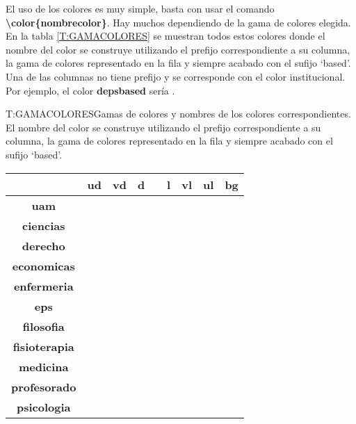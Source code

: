 \def\colbox#1#2{\fcolorbox{maincolor}{#1#2based}{\small\phantom{aaa}}}
\def\mytableline#1{\textbf{#1} & \colbox{ud}{#1} & \colbox{vd}{#1} & \colbox{d}{#1} & \colbox{}{#1} & \colbox{l}{#1} & \colbox{vl}{#1} & \colbox{ul}{#1} & \colbox{bg}{#1} \\}

 \def\colboxc#1#2#3{\fcolorbox{maincolor}{#1#2based#3}{\small\phantom{aaa}}}

 \def\mytablelineb#1#2{\textbf{#2} & \colboxc{#1}{#2}{one} & \colboxc{#1}{#2}{two} & \colboxc{#1}{#2}{three} & \colboxc{#1}{#2}{four} & \colboxc{#1}{#2}{five} & \colboxc{#1}{#2}{six} & \colboxc{#1}{#2}{seven} & \colboxc{#1}{#2}{eight}\\ }

\def\mytablelinec#1#2#3{\textbf{#2} & \colboxc{#1}{#3}{one} & \colboxc{#1}{#3}{two} & \colboxc{#1}{#3}{three} & \colboxc{#1}{#3}{four} & \colboxc{#1}{#3}{five} & \colboxc{#1}{#3}{six} & \colboxc{#1}{#3}{seven} & \colboxc{#1}{#3}{eight} \\ }

El uso de los colores es muy simple, basta con usar el comando \textbf{{\textbackslash}color\{nombrecolor\}}. Hay muchos   dependiendo de la gama de colores elegida. En la tabla \ref{T:GAMACOLORES} se muestran todos estos colores donde el nombre del color se construye utilizando el prefijo correspondiente a su columna, la gama de colores representado en la fila y siempre acabado con el sufijo `based'. Una de las columnas no tiene prefijo y se corresponde con el color institucional. Por ejemplo, el color \textbf{depsbased} sería \colbox{d}{eps}.

\begin{table}[Gamas de colores]{T:GAMACOLORES}{Gamas de colores y nombres de los colores correspondientes. El nombre del color se construye utilizando el prefijo correspondiente a su columna, la gama de colores representado en la fila y siempre acabado con el sufijo `based'.}
\begin{tabular}{|c|cccccccc|}
  \cline{2-9}
  \multicolumn{1}{c|}{} & \textbf{ud} & \textbf{vd} & \textbf{d} &  & \textbf{l} & \textbf{vl} & \textbf{ul} & \textbf{bg} \\
  \hline
  \mytableline{uam}
  \mytableline{ciencias}
  \mytableline{derecho}
  \mytableline{economicas}
  \mytableline{enfermeria}
  \mytableline{eps}
  \mytableline{filosofia}
  \mytableline{fisioterapia}
  \mytableline{medicina}
  \mytableline{profesorado}
  \mytableline{psicologia}
  \hline
\end{tabular}
\end{table}

